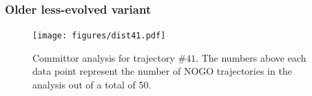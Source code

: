 \documentclass[%
preprint,
 amsmath,amssymb,
 aps,
prb,
]{revtex4-2}
\begin{document}
\subsubsection{Older less-evolved variant}
\begin{figure}[ht!]
\centering
\texttt{[image: figures/dist41.pdf]}
\label{fig:comm41}
\caption{Committor analysis for trajectory $\#41$. The numbers above each data point represent the 
number of NOGO trajectories in the analysis out of a total of 50.}
\end{figure}
\end{document}
